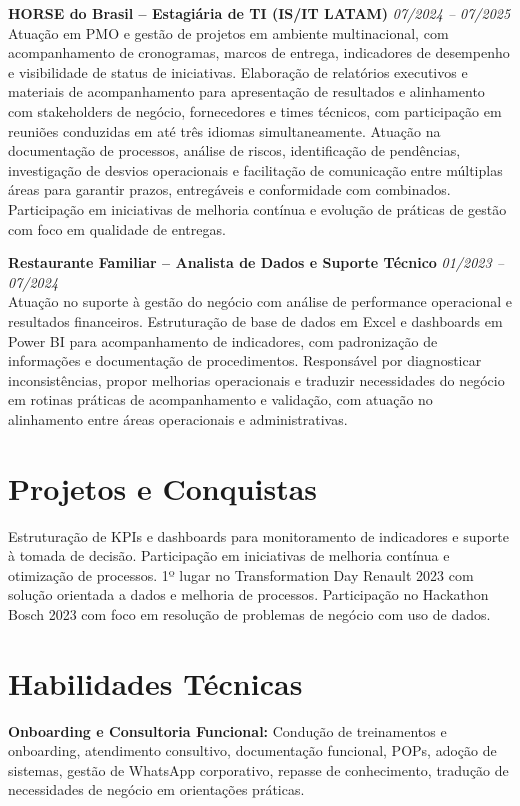 \documentclass[11pt,a4paper]{article}
\newcommand{\experience}[3]{%
  \textbf{#1} \hfill \textit{#2}\\[4pt]
  #3
  \vspace{8pt}
}
\begin{document}
\experience{HORSE do Brasil -- Estagiária de TI (IS/IT LATAM)}{07/2024 -- 07/2025}{%
Atuação em PMO e gestão de projetos em ambiente multinacional, com acompanhamento de cronogramas, marcos de entrega, indicadores de desempenho e visibilidade de status de iniciativas. Elaboração de relatórios executivos e materiais de acompanhamento para apresentação de resultados e alinhamento com stakeholders de negócio, fornecedores e times técnicos, com participação em reuniões conduzidas em até três idiomas simultaneamente. Atuação na documentação de processos, análise de riscos, identificação de pendências, investigação de desvios operacionais e facilitação de comunicação entre múltiplas áreas para garantir prazos, entregáveis e conformidade com combinados. Participação em iniciativas de melhoria contínua e evolução de práticas de gestão com foco em qualidade de entregas.}

\experience{Restaurante Familiar -- Analista de Dados e Suporte Técnico}{01/2023 -- 07/2024}{%
Atuação no suporte à gestão do negócio com análise de performance operacional e resultados financeiros. Estruturação de base de dados em Excel e dashboards em Power BI para acompanhamento de indicadores, com padronização de informações e documentação de procedimentos. Responsável por diagnosticar inconsistências, propor melhorias operacionais e traduzir necessidades do negócio em rotinas práticas de acompanhamento e validação, com atuação no alinhamento entre áreas operacionais e administrativas.}

\section*{Projetos e Conquistas}

Estruturação de KPIs e dashboards para monitoramento de indicadores e suporte à tomada de decisão. Participação em iniciativas de melhoria contínua e otimização de processos. 1º lugar no Transformation Day Renault 2023 com solução orientada a dados e melhoria de processos. Participação no Hackathon Bosch 2023 com foco em resolução de problemas de negócio com uso de dados.

\section*{Habilidades Técnicas}

\textbf{Onboarding e Consultoria Funcional:} Condução de treinamentos e onboarding, atendimento consultivo, documentação funcional, POPs, adoção de sistemas, gestão de WhatsApp corporativo, repasse de conhecimento, tradução de necessidades de negócio em orientações práticas.
\end{document}
